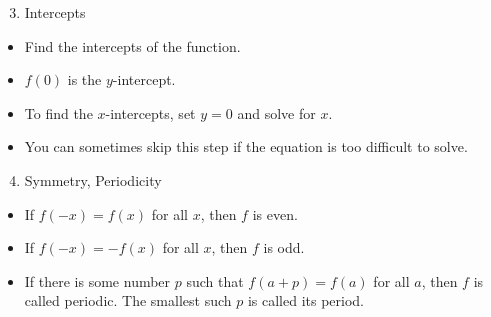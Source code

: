 \begin{frame}[t]
\begin{enumerate}
\setcounter{enumi}{2}
\item  Intercepts
\end{enumerate}
\begin{itemize}
\item  Find the intercepts of the function.
\item  $f(0)$ is the $y$-intercept.
\item  To find the $x$-intercepts, set $y = 0$ and solve for $x$.
\item  You can sometimes skip this step if the equation is too difficult to solve.
\end{itemize}
\end{frame}


\begin{frame}[t]
\begin{enumerate}
\setcounter{enumi}{3}
\item  Symmetry, Periodicity
\end{enumerate}
\begin{itemize}
\item<1-| alert@2>  \alert<handout:1| 0>{If $f(-x) = f(x)$ for all $x$, then $f$ is even.}
\item<1-| alert@3>  \alert<handout:2| 0>{If $f(-x) = -f(x)$ for all $x$, then $f$ is odd.}
\item<1-| alert@4>  \alert<handout:3| 0>{If there is some number $p$ such that $f(a+p) = f(a)$ for all $a$, then $f$ is called periodic.  The smallest such $p$ is called its period.}
\end{itemize}


\hfil\hfil {}
\end{frame}
